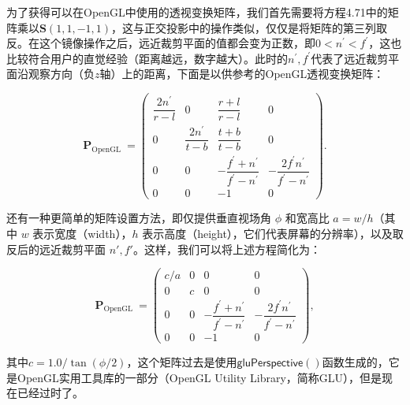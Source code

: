 \documentclass[
  paper=a4,
  ,captions=tableheading
]{scrartcl}
\begin{document}
为了获得可以在OpenGL中使用的透视变换矩阵，我们首先需要将方程4.71中的矩阵乘以\(\mathbf{S}(1,1,-1,1)\)，这与正交投影中的操作类似，仅仅是将矩阵的第三列取反。在这个镜像操作之后，远近裁剪平面的值都会变为正数，即\(0<n^{\prime}<f^{\prime}\)，这也比较符合用户的直觉经验（距离越远，数字越大）。此时的\(n^{\prime},f^{\prime}\)代表了远近裁剪平面沿观察方向（负\(z\)轴）上的距离，下面是以供参考的OpenGL透视变换矩阵：

\[
  \mathbf{P}_{\text {OpenGL }}=
  \left(\begin{array}{cccc}
      \dfrac{2 n^{\prime}}{r-l} & 0                         & \dfrac{r+l}{r-l}                                      & 0                                                       \\[2mm]
      0                         & \dfrac{2 n^{\prime}}{t-b} & \dfrac{t+b}{t-b}                                      & 0                                                       \\[2mm]
      0                         & 0                         & -\dfrac{f^{\prime}+n^{\prime}}{f^{\prime}-n^{\prime}} & -\dfrac{2 f^{\prime} n^{\prime}}{f^{\prime}-n^{\prime}} \\[2mm]
      0                         & 0                         & -1                                                    & 0
    \end{array}\right).
  \tag{4.74}
\]

还有一种更简单的矩阵设置方法，即仅提供垂直视场角 \(\phi\) 和宽高比 \(a = w/h\)（其中 \(w\) 表示宽度（width），\(h\) 表示高度（height），它们代表屏幕的分辨率），以及取反后的远近裁剪平面 \(n', f'\)。这样，我们可以将上述方程简化为：

\[
  \mathbf{P}_{\text {OpenGL }}=
  \left(\begin{array}{cccc}
      c / a & 0 & 0                                                     & 0                                                       \\[2mm]
      0     & c & 0                                                     & 0                                                       \\[2mm]
      0     & 0 & -\dfrac{f^{\prime}+n^{\prime}}{f^{\prime}-n^{\prime}} & -\dfrac{2 f^{\prime} n^{\prime}}{f^{\prime}-n^{\prime}} \\[2mm]
      0     & 0 & -1                                                    & 0
    \end{array}\right),
  \tag{4.75}
\]

其中\(c=1.0 / \tan (\phi / 2)\)，这个矩阵过去是使用\(\mathsf{gluPerspective()}\)函数生成的，它是OpenGL实用工具库的一部分（OpenGL
Utility Library，简称GLU），但是现在已经过时了。
\end{document}
